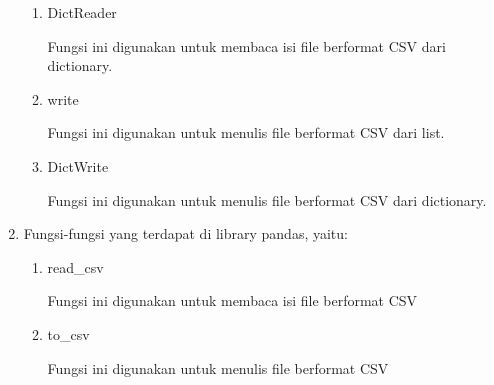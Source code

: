\begin{enumerate}
\begin{enumerate}
		
		
		\item DictReader
		
		Fungsi ini digunakan untuk membaca isi file berformat CSV dari dictionary.
		
		
		
		\item write
		
		Fungsi ini digunakan untuk menulis file berformat CSV dari list.
		
		
		
		\item DictWrite
		
		Fungsi ini digunakan untuk menulis file berformat CSV dari dictionary.
		
		
		
	\end{enumerate}
	
	\item Fungsi-fungsi yang terdapat di library pandas, yaitu:
	\begin{enumerate}
		\item read\_csv
		
		Fungsi ini digunakan untuk membaca isi file berformat CSV
		
		
		
		\item to\_csv
		
		Fungsi ini digunakan untuk menulis file berformat CSV
		
		
		
	\end{enumerate}
\end{enumerate}


\newpage
